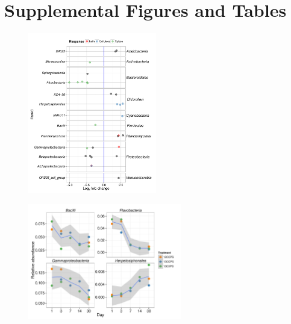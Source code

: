 \section{Supplemental Figures and Tables}

\begin{figure}[H] \begin{center}
\centerline{\includegraphics[width=0.5\textwidth]{figures/l2fc_time/l2fc_time.pdf}}
\caption{\protect}\label{fig:time}
\end{center} \end{figure}

\begin{figure}[H]
	\begin{center}
	\centerline{\includegraphics[width=0.6\textwidth]{figures/abndVtime_class/abndVtime_class.pdf}}
	\caption{\protect}\label{fig:time_class}
    \end{center}
\end{figure}


